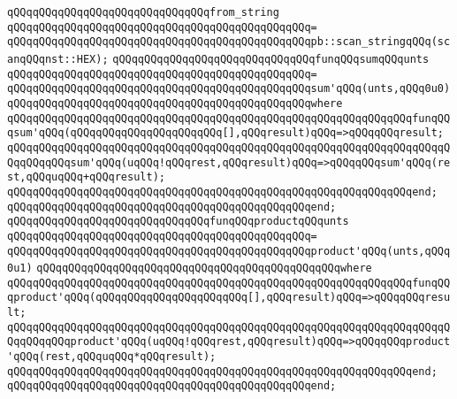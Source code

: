 \newline
\verb|qQQqqQQqqQQqqQQqqQQqqQQqqQQqqQQqfrom_string|\newline
\verb|qQQqqQQqqQQqqQQqqQQqqQQqqQQqqQQqqQQqqQQqqQQqqQQq=|\newline
\verb|qQQqqQQqqQQqqQQqqQQqqQQqqQQqqQQqqQQqqQQqqQQqqQQqpb::scan_stringqQQq(scanqQQqnst::HEX);|\newline
\newline
\verb|qQQqqQQqqQQqqQQqqQQqqQQqqQQqqQQqfunqQQqsumqQQqunts|\newline
\verb|qQQqqQQqqQQqqQQqqQQqqQQqqQQqqQQqqQQqqQQqqQQqqQQq=|\newline
\verb|qQQqqQQqqQQqqQQqqQQqqQQqqQQqqQQqqQQqqQQqqQQqqQQqsum'qQQq(unts,qQQq0u0)|\newline
\verb|qQQqqQQqqQQqqQQqqQQqqQQqqQQqqQQqqQQqqQQqqQQqqQQqwhere|\newline
\verb|qQQqqQQqqQQqqQQqqQQqqQQqqQQqqQQqqQQqqQQqqQQqqQQqqQQqqQQqqQQqqQQqfunqQQqsum'qQQq(qQQqqQQqqQQqqQQqqQQqqQQq[],qQQqresult)qQQq=>qQQqqQQqresult;|\newline
\verb|qQQqqQQqqQQqqQQqqQQqqQQqqQQqqQQqqQQqqQQqqQQqqQQqqQQqqQQqqQQqqQQqqQQqqQQqqQQqqQQqsum'qQQq(uqQQq!qQQqrest,qQQqresult)qQQq=>qQQqqQQqsum'qQQq(rest,qQQquqQQq+qQQqresult);|\newline
\verb|qQQqqQQqqQQqqQQqqQQqqQQqqQQqqQQqqQQqqQQqqQQqqQQqqQQqqQQqqQQqqQQqend;|\newline
\verb|qQQqqQQqqQQqqQQqqQQqqQQqqQQqqQQqqQQqqQQqqQQqqQQqend;|\newline
\newline
\verb|qQQqqQQqqQQqqQQqqQQqqQQqqQQqqQQqfunqQQqproductqQQqunts|\newline
\verb|qQQqqQQqqQQqqQQqqQQqqQQqqQQqqQQqqQQqqQQqqQQqqQQq=|\newline
\verb|qQQqqQQqqQQqqQQqqQQqqQQqqQQqqQQqqQQqqQQqqQQqqQQqproduct'qQQq(unts,qQQq0u1)|\newline
\verb|qQQqqQQqqQQqqQQqqQQqqQQqqQQqqQQqqQQqqQQqqQQqqQQqwhere|\newline
\verb|qQQqqQQqqQQqqQQqqQQqqQQqqQQqqQQqqQQqqQQqqQQqqQQqqQQqqQQqqQQqqQQqfunqQQqproduct'qQQq(qQQqqQQqqQQqqQQqqQQqqQQq[],qQQqresult)qQQq=>qQQqqQQqresult;|\newline
\verb|qQQqqQQqqQQqqQQqqQQqqQQqqQQqqQQqqQQqqQQqqQQqqQQqqQQqqQQqqQQqqQQqqQQqqQQqqQQqqQQqproduct'qQQq(uqQQq!qQQqrest,qQQqresult)qQQq=>qQQqqQQqproduct'qQQq(rest,qQQquqQQq*qQQqresult);|\newline
\verb|qQQqqQQqqQQqqQQqqQQqqQQqqQQqqQQqqQQqqQQqqQQqqQQqqQQqqQQqqQQqqQQqend;|\newline
\verb|qQQqqQQqqQQqqQQqqQQqqQQqqQQqqQQqqQQqqQQqqQQqqQQqend;|\newline
